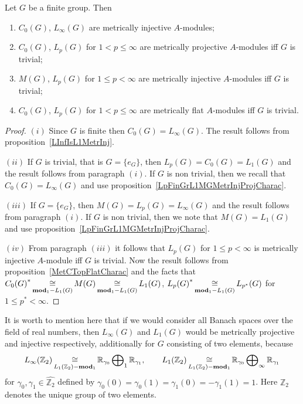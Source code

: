 \begin{proposition}\label{StdModFinGrL1MGMetrInjProjFlatCharac} Let $G$ be a
finite group. Then

\begin{enumerate}[label = (\roman*)]
    \item $C_0(G)$, $L_\infty(G)$ are metrically injective $A$-modules;

    \item $C_0(G)$, $L_p(G)$ for $1<p\leq\infty$ are metrically projective
    $A$-modules iff $G$ is trivial;

    \item $M(G)$, $L_p(G)$ for $1\leq p<\infty$ are metrically injective
    $A$-modules iff $G$ is trivial;

    \item $C_0(G)$, $L_p(G)$ for $1<p\leq\infty$ are metrically 
    flat $A$-modules iff $G$ is trivial.
\end{enumerate}
\end{proposition}
\begin{proof}
$(i)$ Since $G$ is finite then $C_0(G)=L_\infty(G)$. The result follows from
proposition~\ref{LInfIsL1MetrInj}.

$(ii)$ If $G$ is trivial, that is $G= \{e_G \}$, then $L_p(G)=C_0(G)=L_1(G)$ and
the result follows from paragraph $(i)$. If $G$ is non trivial, then we recall
that $C_0(G)=L_\infty(G)$ and use
proposition~\ref{LpFinGrL1MGMetrInjProjCharac}.

$(iii)$ If $G= \{e_G \}$, then $M(G)=L_p(G)=L_\infty(G)$ and the result follows
from paragraph $(i)$. If $G$ is non trivial, then we note that $M(G)=L_1(G)$ and
use proposition~\ref{LpFinGrL1MGMetrInjProjCharac}.

$(iv)$ From paragraph $(iii)$ it follows that $L_p(G)$ for $1\leq p<\infty$ is
metrically injective $A$-module iff $G$ is trivial. Now the result follows from
proposition~\ref{MetCTopFlatCharac} and the facts that
${C_0(G)}^*\mathop{\mathbin{\cong}}\limits_{\mathbf{mod}_1-L_1(G)}M(G)\mathop{\mathbin{\cong}}\limits_{\mathbf{mod}_1-L_1(G)}L_1(G)$,
${L_p(G)}^*\mathop{\mathbin{\cong}}\limits_{\mathbf{mod}_1-L_1(G)}L_{p^*}(G)$ for $1\leq p^*<\infty$.
\end{proof}

It is worth to mention here that if we would consider all Banach spaces over the
field of real numbers, then $L_\infty(G)$ and $L_1(G)$ would be metrically
projective and injective respectively,  additionally for $G$ consisting of two
elements, because
$$
L_\infty(\mathbb{Z}_2)
\mathop{\mathbin{\cong}}\limits_{L_1(\mathbb{Z}_2)-\mathbf{mod}_1}
\mathbb{R}_{\gamma_0}\bigoplus\nolimits_1\mathbb{R}_{\gamma_1},
\qquad
L_1(\mathbb{Z}_2)
\mathop{\mathbin{\cong}}\limits_{L_1(\mathbb{Z}_2)-\mathbf{mod}_1}
\mathbb{R}_{\gamma_0}\bigoplus\nolimits_\infty\mathbb{R}_{\gamma_1}
$$
for $\gamma_0,\gamma_1\in\widehat{\mathbb{Z}_2}$ defined by
$\gamma_0(0)=\gamma_0(1)=\gamma_1(0)=-\gamma_1(1)=1$. Here $\mathbb{Z}_2$
denotes the unique group of two elements.

